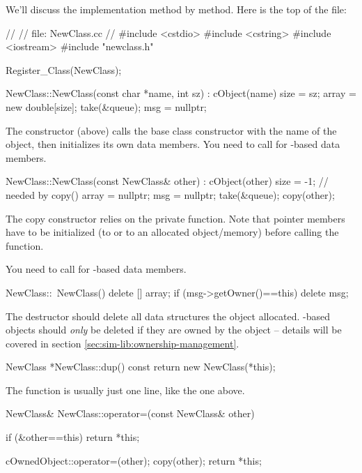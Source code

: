We'll discuss the implementation method by method.
Here is the top of the  file:

\begin{cpp}
//
// file: NewClass.cc
//
#include <cstdio>
#include <cstring>
#include <iostream>
#include "newclass.h"

Register_Class(NewClass);

NewClass::NewClass(const char *name, int sz) : cObject(name)
{
    size = sz;
    array = new double[size];
    take(&queue);
    msg = nullptr;
}
\end{cpp}

The constructor (above) calls the base class constructor with
the name of the object, then initializes its own data members.
You need to call  for -based data members.

\begin{cpp}
NewClass::NewClass(const NewClass& other) : cObject(other)
{
    size = -1; // needed by copy()
    array = nullptr;
    msg = nullptr;
    take(&queue);
    copy(other);
}
\end{cpp}

The copy constructor relies on the private  function.
Note that pointer members have to be initialized (to  or to an
allocated object/memory) before calling the  function.

You need to call  for -based data members.

\begin{cpp}
NewClass::~NewClass()
{
    delete [] array;
    if (msg->getOwner()==this)
        delete msg;
}
\end{cpp}

The destructor should delete all data structures the object allocated.
-based objects should \textit{only} be deleted if they
are owned by the object -- details will be covered in section
\ref{sec:sim-lib:ownership-management}.

\begin{cpp}
NewClass *NewClass::dup() const
{
    return new NewClass(*this);
}
\end{cpp}

The  function is usually just one line, like the one above.

\begin{cpp}
NewClass& NewClass::operator=(const NewClass& other)
{
    if (&other==this)
        return *this;

    cOwnedObject::operator=(other);
    copy(other);
    return *this;
}
\end{cpp}

